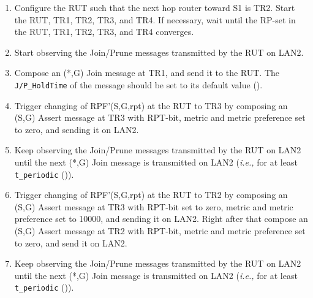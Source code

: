\documentclass[11pt]{report}
\newcommand{\ie}{\emph{i.e.,}\xspace}
\begin{document}
\begin{enumerate}

  \item Configure the RUT such that the next hop router toward S1 is
  TR2. Start the RUT, TR1, TR2, TR3, and TR4. If necessary, wait until the
  RP-set in the RUT, TR1, TR2, TR3, and TR4 converges.

  \item Start observing the Join/Prune messages transmitted by the RUT on
  LAN2.

  \item Compose an (*,G) Join message at TR1, and send it to the RUT. 
  The \verb=J/P_HoldTime= of the message should be set to its default
  value ({\PimsmJPHoldTime}).

  \item Trigger changing of RPF'(S,G,rpt) at the RUT to TR3 by composing an
  (S,G) Assert message at TR3 with RPT-bit, metric and metric 
  preference set to zero, and sending it on LAN2.

  \item Keep observing the Join/Prune messages transmitted by the
  RUT on LAN2 until the next (*,G) Join message is transmitted on
  LAN2 (\ie for at least \verb=t_periodic= ({\PimsmTPeriodic})).

  \item Trigger changing of RPF'(S,G,rpt) at the RUT to TR2 by composing an
  (S,G) Assert message at TR3 with RPT-bit set to zero, metric and metric 
  preference set to 10000, and sending it on LAN2. Right after that
  compose an (S,G) Assert message at TR2 with RPT-bit, metric and metric 
  preference set to zero, and send it on LAN2.

  \item Keep observing the Join/Prune messages transmitted by the
  RUT on LAN2 until the next (*,G) Join message is transmitted on
  LAN2 (\ie for at least \verb=t_periodic= ({\PimsmTPeriodic})).

\end{enumerate}


\end{document}
